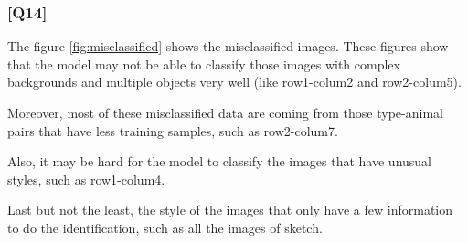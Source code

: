 \documentclass{article}
\begin{document}
\subsubsection*{[Q14]}

The figure \ref{fig:misclassified} shows the misclassified images.
These figures show that the model may not be able to classify those images with complex backgrounds and multiple objects very well (like row1-colum2 and row2-colum5).

Moreover, most of these misclassified data are coming from those type-animal pairs that have less training samples, such as row2-colum7.

Also, it may be hard for the model to classify the images that have unusual styles, such as row1-colum4.

Last but not the least, the style of the images that only have a few information to do the identification, such as all the images of sketch.
\end{document}
